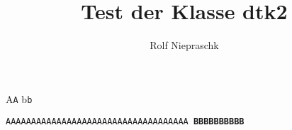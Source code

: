 \documentclass{dtk2}
\author{Rolf Niepraschk}
\begin{document}
\title{Test der Klasse dtk2}

\maketitle

A\texttt{A} b\texttt{b}

\texttt{AAAAAAAAAAAAAAAAAAAAAAAAAAAAAAAAAAAA \bfseries BBBBBBBBBB}


\end{document}
